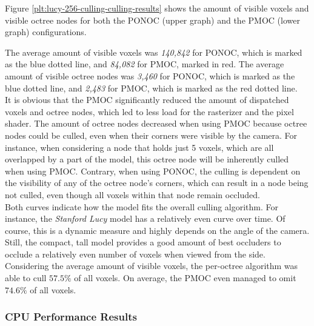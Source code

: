 
\noindent
Figure \ref{plt:lucy-256-culling-culling-results} shows the amount of visible voxels and visible octree 
nodes for both the \ac{PONOC} (upper graph) and the \ac{PMOC} (lower graph) configurations. \\


The average amount of visible voxels was \emph{140,842} for \ac{PONOC}, which is marked 
as the blue dotted line, and \emph{84,082} for \ac{PMOC}, marked in red. The average 
amount of visible octree nodes was \emph{3,460} for \ac{PONOC}, which is marked as the 
blue dotted line, and \emph{2,483} for \ac{PMOC}, which is marked as the red dotted 
line. \\

It is obvious that the \ac{PMOC} significantly reduced the amount of dispatched voxels and octree nodes, 
which led to less load for the rasterizer and the pixel shader. The amount of octree nodes decreased when using 
\ac{PMOC} because octree nodes could be culled, even when their corners were visible by the camera. 
For instance, when considering a node that holds just 5 voxels, which are all overlapped by a part of the model, 
this octree node will be inherently culled when using \ac{PMOC}. Contrary, when using \ac{PONOC}, 
the culling is dependent on the visibility of any of the octree node's corners, which can result in a node being not 
culled, even though all voxels within that node remain occluded. \\

\noindent 
Both curves indicate how the model fits the overall culling algorithm. For instance, the \emph{Stanford Lucy} 
model has a relatively even curve over time. Of course, this is a dynamic measure and highly depends on the 
angle of the camera. Still, the compact, tall model provides a good amount of best occluders to occlude a 
relatively even number of voxels when viewed from the side. \\

\noindent
Considering the average amount of visible voxels, the per-octree algorithm was able to cull $57.5\%$ of all 
voxels. On average, the \ac{PMOC} even managed to omit $74.6\%$ of all voxels. 

\subsubsection*{CPU Performance Results} \label{subsubsec-cpu-performance-results-lucy}

